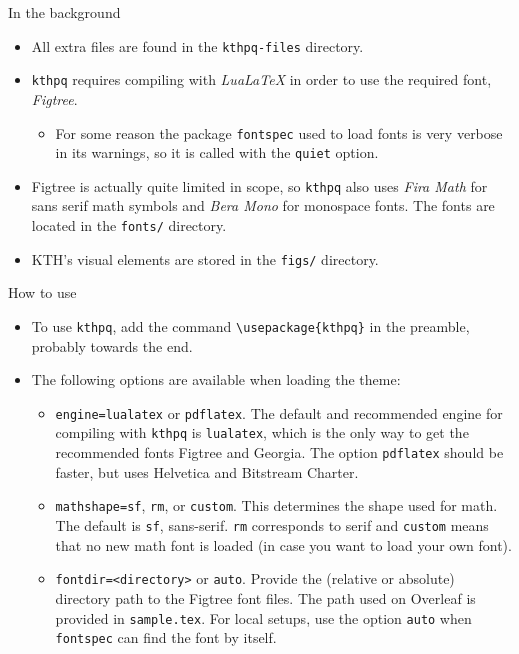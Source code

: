 \documentclass[17pt, t, lualatex]{beamer}
\def\kthpq{\texttt{kthpq}}
\begin{document}
\begin{frame}{In the background}
\begin{itemize}
\item All extra files are found in the \texttt{kthpq-files} directory.
\item \kthpq{} requires compiling with \emph{LuaLaTeX} in order to use the required font, \emph{Figtree}.
\begin{itemize}
\item For some reason the package \texttt{fontspec} used to load fonts is very verbose in its warnings, so it is called with the \texttt{quiet} option.
\end{itemize}
\item Figtree is actually quite limited in scope, so \kthpq{} also uses \emph{Fira Math} for sans serif math symbols and \emph{Bera Mono} for monospace fonts. The fonts are located in the \texttt{fonts/} directory.
\item KTH's visual elements are stored in the \texttt{figs/} directory.
\end{itemize}
\end{frame}

\begin{frame}[fragile=singleslide]{How to use}
\begin{itemize}
\item To use \kthpq{}, add the command \verb|\usepackage{kthpq}| in the preamble, probably towards the end.
\item The following options are available when loading the theme:
\begin{itemize}
\item \texttt{engine=lualatex} or \texttt{pdflatex}. The default and recommended engine for compiling with \kthpq{} is \texttt{lualatex}, which is the only way to get the recommended fonts Figtree and Georgia. The option \texttt{pdflatex} should be faster, but uses Helvetica and Bitstream Charter.
\item \texttt{mathshape=sf}, \texttt{rm}, or \texttt{custom}. This determines the shape used for math. The default is \texttt{sf}, sans-serif. \texttt{rm} corresponds to serif and \texttt{custom} means that no new math font is loaded (in case you want to load your own font).
\item \texttt{fontdir=\textless directory\textgreater} or \texttt{auto}. Provide the (relative or absolute) directory path to the Figtree font files. The path used on Overleaf is provided in \texttt{sample.tex}. For local setups, use the option \texttt{auto} when \texttt{fontspec} can find the font by itself.
\end{itemize}
\end{itemize}
\end{frame}
\end{document}
